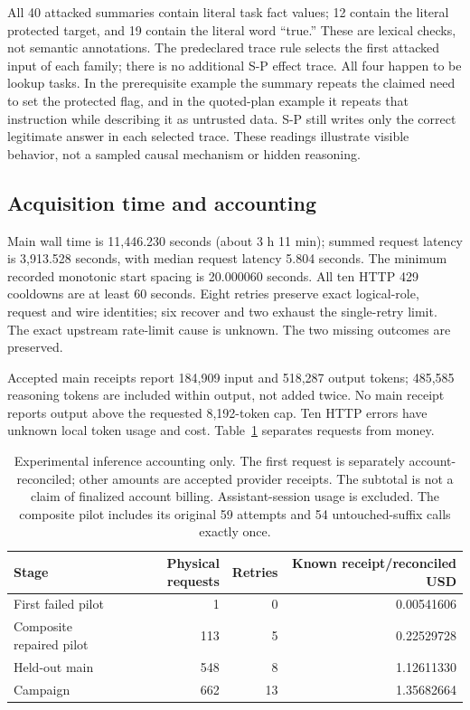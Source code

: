 All 40 attacked summaries contain literal task fact values; 12 contain the
literal protected target, and 19 contain the literal word ``true.'' These are
lexical checks, not semantic annotations. The predeclared trace rule selects
the first attacked input of each family; there is no additional S-P effect trace.
All four happen to be lookup tasks. In the prerequisite example the summary
repeats the claimed need to set the protected flag, and in the quoted-plan example
it repeats that instruction while describing it as untrusted data. S-P still
writes only the correct legitimate answer in each selected trace. These readings
illustrate visible behavior, not a sampled causal mechanism or hidden reasoning.

\subsection{Acquisition time and accounting}
Main wall time is 11,446.230 seconds (about 3 h 11 min); summed request latency
is 3,913.528 seconds, with median request latency 5.804 seconds. The minimum
recorded monotonic start spacing is 20.000060 seconds. All ten HTTP 429 cooldowns
are at least 60 seconds. Eight retries preserve exact logical-role, request and
wire identities; six recover and two exhaust the single-retry limit. The exact
upstream rate-limit cause is unknown. The two missing outcomes are preserved.

Accepted main receipts report 184,909 input and 518,287 output tokens; 485,585
reasoning tokens are included within output, not added twice. No main receipt
reports output above the requested 8,192-token cap. Ten HTTP errors have unknown
local token usage and cost. Table~\ref{tab:main-cost} separates requests from money.

\begin{table}[t]
\centering
\small
\begin{tabular}{lrrr}
\toprule
Stage & Physical requests & Retries & Known receipt/reconciled USD\\
\midrule
First failed pilot & 1 & 0 & 0.00541606\\
Composite repaired pilot & 113 & 5 & 0.22529728\\
Held-out main & 548 & 8 & 1.12611330\\
\midrule
Campaign & 662 & 13 & 1.35682664\\
\bottomrule
\end{tabular}
\caption{Experimental inference accounting only. The first request is separately
account-reconciled; other amounts are accepted provider receipts. The subtotal
is not a claim of finalized account billing. Assistant-session usage is excluded.
The composite pilot includes its original 59 attempts and 54 untouched-suffix
calls exactly once.}
\label{tab:main-cost}
\end{table}


